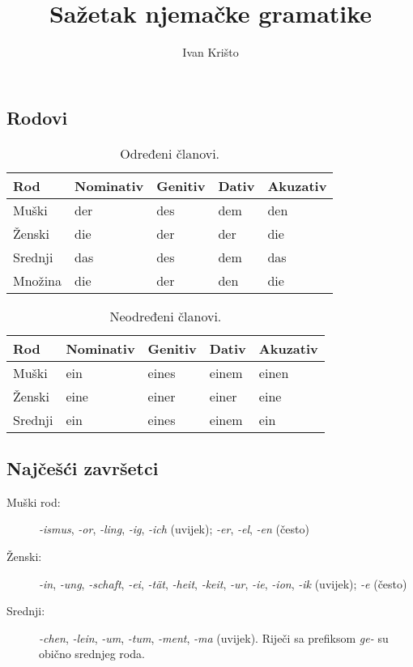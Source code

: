 \documentclass[12pt,german]{article}
\author{Ivan Krišto}
\newcommand{\nastavak}[1]{\emph{-#1}}
\newcommand{\prefiks}[1]{\emph{#1-}}
\begin{document}
\title{Sažetak njemačke gramatike}
\date{}
\maketitle


\begin{multicols}{2}
\section{Rodovi}

\begin{table}[H]
\caption{Određeni članovi.}
\begin{tabular}{lllll}
\toprule
Rod & Nominativ & Genitiv & Dativ & Akuzativ \\
\midrule
Muški & der & des & dem & den \\
Ženski & die & der & der & die \\
Srednji & das & des & dem & das \\
Množina & die & der & den & die \\
\bottomrule
\end{tabular}
\end{table}

\begin{table}[H]
\caption{Neodređeni članovi.}
\begin{tabular}{lllll}
\toprule
Rod & Nominativ & Genitiv & Dativ & Akuzativ \\
\midrule
Muški & ein & eines & einem & einen \\
Ženski & eine & einer & einer & eine \\
Srednji & ein & eines & einem & ein \\
\bottomrule
\end{tabular}
\end{table}

\subsection{Najčešći završetci}
\begin{description}
  \item[Muški rod:]
    \nastavak{ismus}, \nastavak{or}, \nastavak{ling}, \nastavak{ig},
    \nastavak{ich} (uvijek); \nastavak{er}, \nastavak{el}, \nastavak{en}
    (često)
  \item[Ženski:]
    \nastavak{in}, \nastavak{ung}, \nastavak{schaft}, \nastavak{ei},
    \nastavak{t\"at}, \nastavak{heit}, \nastavak{keit}, \nastavak{ur},
    \nastavak{ie}, \nastavak{ion}, \nastavak{ik} (uvijek);
    \nastavak{e} (često)
  \item[Srednji:]
    \nastavak{chen}, \nastavak{lein}, \nastavak{um}, \nastavak{tum},
    \nastavak{ment}, \nastavak{ma} (uvijek). Riječi sa prefiksom \prefiks{ge}
    su obično srednjeg roda.
\end{description}


\end{multicols}
\end{document}
